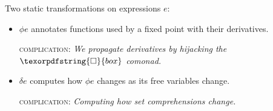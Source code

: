 \documentclass[aspectratio=169,dvipsnames]{beamer}
\providecommand\strong[1]{{\bfseries#1}}
\newcommand\iso{{\texorpdfstring{\ensuremath{\square}}{box}}}
\newcommand\fix{\n{fix}}
\newcommand\semifix{\n{semifix}}
\newcommand\hilite{\color{Rhodamine}}
\newcommand\hi[1]{{\hilite#1}}
\begin{document}


  \begin{frame}

    Two static transformations on expressions $e$:
    \vspace{1ex}
    \begin{itemize}
    \item \hi{$\phi e$} annotates functions used by a fixed point with their
      derivatives.\\[1ex]

      {\normalsize\sffamily\textsc{complication:} \it We propagate
        derivatives by hijacking the $\iso$ comonad.\par}

    \item \hi{$\delta e$} computes how $\phi e$ changes as
      its free variables change.
      \\[1ex]
      {\normalsize\sffamily\textsc{complication:}
        \it Computing how set comprehensions change.
        \par}
    \end{itemize}
  \end{frame}
\end{document}
